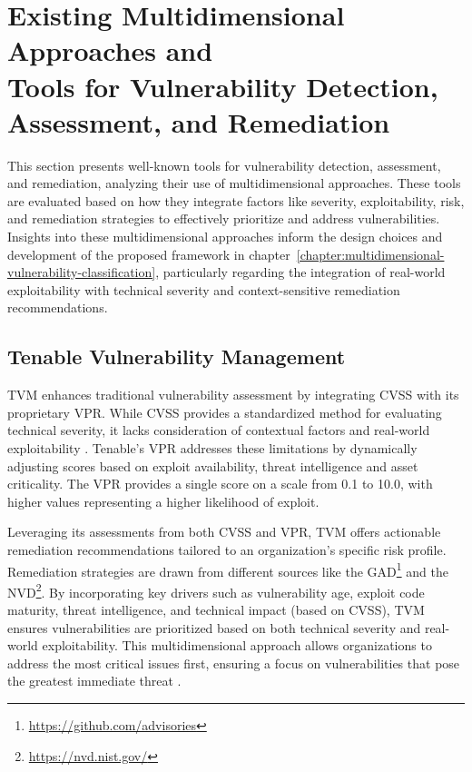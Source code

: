 \section{Existing Multidimensional Approaches and \\ Tools for Vulnerability Detection, \\ Assessment, and Remediation}
\label{sec:multidimensional-approaches-tools}

This section presents well-known tools for vulnerability detection, assessment, and remediation, analyzing their use of multidimensional approaches. These tools are evaluated based on how they integrate factors like severity, exploitability, risk, and remediation strategies to effectively prioritize and address vulnerabilities. Insights into these multidimensional approaches inform the design choices and development of the proposed framework in chapter~\ref{chapter:multidimensional-vulnerability-classification}, particularly regarding the integration of real-world exploitability with technical severity and context-sensitive remediation recommendations.

\subsection{Tenable Vulnerability Management}
\label{subsec:tenable-vulnerability-management}

\ac{TVM} enhances traditional vulnerability assessment by integrating \ac{CVSS} with its proprietary \ac{VPR}. While \ac{CVSS} provides a standardized method for evaluating technical severity, it lacks consideration of contextual factors and real-world exploitability \autocite{spring_time_2021}. Tenable's \ac{VPR} addresses these limitations by dynamically adjusting scores based on exploit availability, threat intelligence and asset criticality. The \ac{VPR} provides a single score on a scale from 0.1 to 10.0, with higher values representing a higher likelihood of exploit.

Leveraging its assessments from both \ac{CVSS} and \ac{VPR}, \ac{TVM} offers actionable remediation recommendations tailored to an organization's specific risk profile. Remediation strategies are drawn from different sources like the \ac{GAD}\footnote{\url{https://github.com/advisories}} and the \ac{NVD}\footnote{\url{https://nvd.nist.gov/}}. By incorporating key drivers such as vulnerability age, exploit code maturity, threat intelligence, and technical impact (based on \ac{CVSS}), \ac{TVM} ensures vulnerabilities are prioritized based on both technical severity and real-world exploitability. This multidimensional approach allows organizations to address the most critical issues first, ensuring a focus on vulnerabilities that pose the greatest immediate threat \autocite{tenable_inc_vulnerability_2024}.

